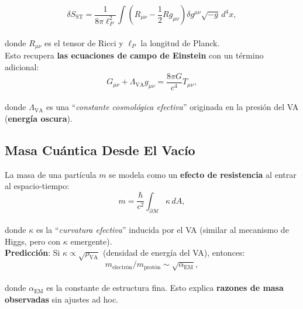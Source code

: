 \documentclass[a4paper]{article}
\theoremstyle{definition}
\theoremstyle{remark}
\numberwithin{equation}{section}
\begin{document}
	\begin{equation}
		\delta S_{\text{ST}} = \frac{1}{8\pi \ell_P^2} \int \left( R_{\mu\nu} - \frac{1}{2} R g_{\mu\nu} \right) \delta g^{\mu\nu} \sqrt{-g} \, d^4 x,
	\end{equation}\\
	
	donde \( R_{\mu\nu} \) es el tensor de Ricci y \( \ell_P \) la longitud de Planck.\\
	
	Esto recupera \textbf{las ecuaciones de campo de Einstein} con un término adicional:\\
	
	\[
	G_{\mu\nu} + \Lambda_{\text{VA}} g_{\mu\nu} = \frac{8\pi G}{c^4} T_{\mu\nu},
	\]\\
	
	donde \( \Lambda_{\text{VA}} \) es una ``\textit{constante cosmológica efectiva}'' originada en la presión del VA (\textbf{energía oscura}).
	
	
	\subsection{Masa Cuántica Desde El Vacío}
	
	La masa de una partícula \( m \) se modela como un \textbf{efecto de resistencia} al entrar al espacio-tiempo:\\
	
	\begin{equation}
		m = \frac{\hbar}{c^2} \int_{\partial \mathcal{M}} \kappa \, dA,
	\end{equation}\\
	
	donde \( \kappa \) es la ``\textit{curvatura efectiva}'' inducida por el VA (similar al mecanismo de Higgs, pero con \( \kappa \) emergente).\\
	
	\textbf{Predicción}: Si \( \kappa \propto \sqrt{\rho_{\text{VA}}} \) (densidad de energía del VA), entonces:\\
	
	\begin{equation}
		m_{\text{electrón}} / m_{\text{protón}} \sim \sqrt{\alpha_{\text{EM}}},
	\end{equation}\\
	
	donde \( \alpha_{\text{EM}} \) es la constante de estructura fina. Esto explica \textbf{razones de masa observadas} sin ajustes ad hoc.
	
\end{document}

